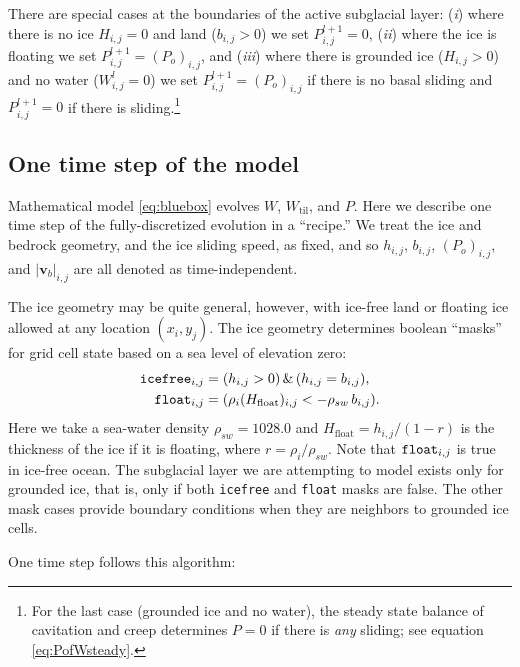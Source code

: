 \documentclass[gmd]{copernicus}   %
\newcommand{\text}{\textrm}
\newcommand\bv{\mathbf{v}}
\newcommand{\Wtil}{W_{\text{til}}}
\begin{document}
There are special cases at the boundaries of the active subglacial layer: (\emph{i}) where there is no ice $H_{i,j}=0$ and land ($b_{i,j}>0$) we set $P_{i,j}^{l+1}=0$, (\emph{ii}) where the ice is floating we set $P_{i,j}^{l+1}=(P_o)_{i,j}$, and (\emph{iii}) where there is grounded ice ($H_{i,j}>0$) and no water ($W_{i,j}^l=0$) we set $P_{i,j}^{l+1}=(P_o)_{i,j}$ if there is no basal sliding and $P_{i,j}^{l+1}=0$ if there is sliding.\footnote{For the last case (grounded ice and no water), the steady state balance of cavitation and creep determines $P=0$ if there is \emph{any} sliding; see equation \eqref{eq:PofWsteady}.}

\subsection{One time step of the model}  Mathematical model \eqref{eq:bluebox} evolves $W$, $\Wtil$, and $P$.  Here we describe one time step of the fully-discretized evolution in a ``recipe.''  We treat the ice and bedrock geometry, and the ice sliding speed, as fixed, and so $h_{i,j}$, $b_{i,j}$, $(P_o)_{i,j}$, and $|\bv_b|_{i,j}$ are all denoted as time-independent.

The ice geometry may be quite general, however, with ice-free land or floating ice allowed at any location $(x_i,y_j)$.  The ice geometry determines boolean ``masks'' for grid cell state based on a sea level of elevation zero:
\begin{align*}
\text{\texttt{icefree}}_{i,j} &= (h_{i,j} > 0)\, \&\, (h_{i,j} = b_{i,j}), \\
\text{\texttt{float}}_{i,j}   &= (\rho_i (H_{\text{float}})_{i,j} < - \rho_{sw}\, b_{i,j}).
\end{align*}
Here we take a sea-water density $\rho_{sw}=1028.0$ and $H_{\text{float}}=h_{i,j} / (1 - r)$  is the thickness of the ice if it is floating, where $r=\rho_i / \rho_{sw}$.  Note that $\text{\texttt{float}}_{i,j}$ is true in ice-free ocean.  The subglacial layer we are attempting to model exists only for grounded ice, that is, only if both \texttt{icefree} and \texttt{float} masks are false.  The other mask cases provide boundary conditions when they are neighbors to grounded ice cells.

One time step follows this algorithm:
\end{document}
